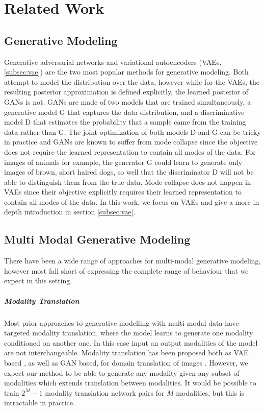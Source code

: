 \chapter{Related Work}
\section{Generative Modeling}
Generative adversarial networks \citep[GANs]{goodfellow_generative_2014} and variational autoencoders (VAEs, \cref{subsec:vae}) are the two most popular methods for generative modeling.
Both attempt to model the distribution over the data, however while for the VAEs, the resulting posterior approximation is defined explicitly, the learned posterior of GANs is not.
GANs are made of two models that are trained simultaneously, a generative model G that captures the data distribution, and a discriminative model D that estimates the probability that a sample came from the training data rather than G.
The joint optimization of both models D and G can be tricky in practice and GANs are known to suffer from mode collapse since the objective does not require the learned representation to contain all modes of the data.
For images of animals for example, the generator G could learn to generate only images of brown, short haired dogs, so well that the discriminator D will not be able to distinguish them from the true data.
Mode collapse does not happen in VAEs since their objective explicitly requires their learned representation to contain all modes of the data.
In this work, we focus on VAEs and give a more in depth introduction in section \cref{subsec:vae}.

\section{Multi Modal Generative Modeling}

There have been a wide range of approaches for multi-modal generative modeling, however most fall short of expressing the complete range of behaviour that we expect in this setting.

\paragraph{Modality Translation}
Most prior approaches to generative modelling with multi modal data have targeted modality translation, where the model learns to generate one modality conditioned on another one.
In this case input an output modalities of the model are not interchangeable.
Modality translation has been proposed both as VAE based \citep{pandey2017variational, pu2016variational}, as well as GAN based, for domain translation of images \citep{ledig2017photo, liu2019few}.
However, we expect our method to be able to generate any modality given any subset of modalities which extends translation between modalities.
It would be possible to train $2^M -1$ modality translation network pairs for $M$ modalities, but this is intractable in practice.

